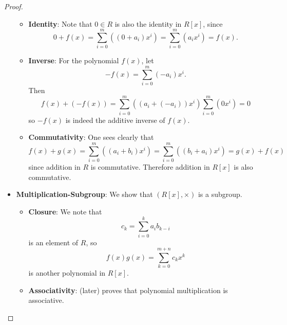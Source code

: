 \begin{proof}
\begin{itemize}
\begin{itemize}
            \item \textbf{Identity}: Note that $0 \in R$ is also the identity in $R[x]$, since
            \[
                0 + f(x) = \sum_{i=0}^m\left((0+a_i)x^i\right) = \sum_{i=0}^m\left(a_ix^i\right) = f(x).
            \]
            
            \item \textbf{Inverse}: For the polynomial $f(x)$, let
            \[
                -f(x) = \sum_{i=0}^m(-a_i)x^i.
            \]
            Then
            \[
                f(x) + (-f(x)) = \sum_{i=0}^m\left((a_i+(-a_i))x^i\right) \sum_{i=0}^m\left(0x^i\right) = 0
           \]
           so $-f(x)$ is indeed the additive inverse of $f(x)$.
            
            \item \textbf{Commutativity}: One sees clearly that
            \[
                f(x) + g(x) = \sum_{i=0}^m\left((a_i+b_i)x^i\right) = \sum_{i=0}^m\left((b_i + a_i)x^i\right) = g(x) + f(x)
            \]
            since addition in $R$ is commutative. Therefore addition in $R[x]$ is also commutative.
        \end{itemize}

        \item \textbf{Multiplication-Subgroup}: We show that $(R[x], \times)$ is a subgroup.
        \begin{itemize}
            \item \textbf{Closure}: We note that
            \[
                c_k = \sum_{i=0}^k a_ib_{k-i}
            \]
            is an element of $R$, so
            \[
                f(x)g(x) = \sum_{k=0}^{m+n}c_kx^k
            \]
            is another polynomial in $R[x]$.
            
            \item \textbf{Associativity}:  (later) proves that polynomial multiplication is associative.
        \end{itemize}


\end{itemize}
\end{proof}
